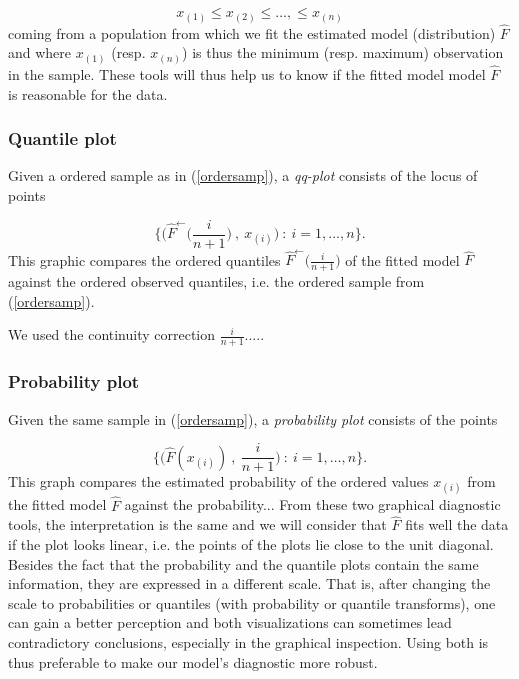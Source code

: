 \documentclass[11pt,a4paper,openany ]{book}
\begin{document}
\begin{equation} \label{ordersamp}
x_{(1)}\leq x_{(2)}\leq\dots,\leq x_{(n)}
\end{equation}
coming from a population from which we fit the estimated model (distribution) $\hat{F}$ and where $x_{(1)}$ (resp. $x_{(n)}$) is thus the minimum (resp. maximum) observation in the sample. These tools will thus help us to know if the fitted model model $\hat{F}$ is reasonable for the data.

\subsubsection*{Quantile plot} Given a ordered sample as in (\ref{ordersamp}), a \emph{qq-plot} consists of the locus of points 

\begin{equation}
\Bigg\{\bigg(\hat{F}^{\leftarrow}\Big(\frac{i}{n+1}\Big)\ ,\ x_{(i)}\bigg) \ : \ i=1,\dots,n\Bigg\}.
\end{equation}
This graphic compares the ordered quantiles $\hat{F}^{\leftarrow}\Big(\frac{i}{n+1}\Big)$ of the fitted model $\hat{F}$ against the ordered observed quantiles, i.e. the ordered sample from (\ref{ordersamp}).

We used the continuity correction $\frac{i}{n+1}$.....


\subsubsection*{Probability plot} Given the same sample in (\ref{ordersamp}), a \emph{probability plot} consists of the points 

\begin{equation}
\Bigg\{\bigg(\hat{F}(x_{(i)})\ ,\ \frac{i}{n+1}\bigg) \ : \ i=1,\dots,n\Bigg\}.
\end{equation}
This graph compares the estimated probability of the ordered values $x_{(i)}$ from the fitted model $\hat{F}$ against the probability...
\newline
From these two graphical diagnostic tools, the interpretation is the same and we will consider that $\hat{F}$ fits well the data if the plot looks linear, i.e. the points of the plots lie close to the unit diagonal.
\newline
Besides the fact that the probability and the quantile plots contain the same information, they are expressed in a different scale. That is, after changing the scale to probabilities or quantiles (with probability or quantile transforms), one can gain a better perception and both visualizations can sometimes lead contradictory conclusions, especially in the graphical inspection. Using both is thus preferable to make our model's diagnostic more robust.
\end{document}
